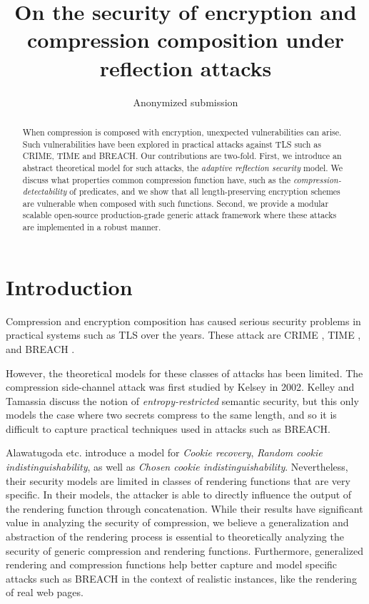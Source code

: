 \documentclass{sig-alternate-05-2015}
\title{On the security of encryption and compression composition under reflection attacks}
\author{
    Anonymized submission
}
\begin{document}
\maketitle

\begin{abstract}
When compression is composed with encryption, unexpected vulnerabilities can
arise. Such vulnerabilities have been explored in practical
attacks against TLS such as CRIME, TIME and BREACH.
Our contributions are two-fold.
First, we introduce an abstract theoretical model for such attacks, the
\textit{adaptive reflection security} model. We discuss what properties common
compression function have, such as the \textit{compression-detectability} of
predicates, and we show that all length-preserving encryption schemes are
vulnerable when composed with such functions.
Second, we provide a modular
scalable open-source production-grade generic attack framework where these
attacks are implemented in a robust manner.
\end{abstract}

\section{Introduction}\label{sec:prev}

Compression and encryption composition has caused serious security problems
in practical systems such as TLS over the years. These
attack are CRIME \cite{c1}, TIME \cite{c2}, and BREACH \cite{c3}.

However, the theoretical models for these classes of attacks has been limited.
The compression side-channel attack was first studied by Kelsey \cite{c4} in 2002.
Kelley and Tamassia\cite{c5}  discuss the notion of \textit{entropy-restricted} semantic
security, but this only models the case where two secrets compress to the same
length, and so it is difficult to capture practical techniques used in attacks
such as BREACH.

Alawatugoda etc. \cite{c6} introduce a model for \textit{Cookie recovery},
\textit{Random cookie indistinguishability}, as well as \textit{Chosen cookie indistinguishability}.
Nevertheless, their security models are limited in classes of rendering functions
that are very specific. In their models, the attacker is able to directly influence
the output of the rendering function through concatenation. While their results
have significant value in analyzing the security of compression, we believe
a generalization and abstraction of the rendering process is essential to
theoretically analyzing the security of generic compression and rendering functions.
Furthermore, generalized rendering and compression functions help better
capture and model specific attacks such as BREACH in the context of
realistic instances, like the rendering of real web pages.
\end{document}
